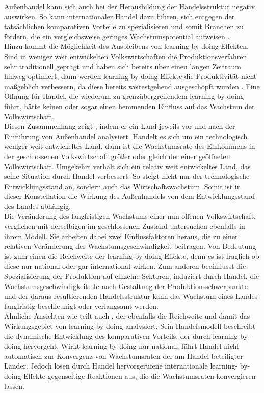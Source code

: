%
 Außenhandel kann sich auch bei der Herausbildung der Handelsstruktur negativ auswirken. So kann internationaler Handel dazu führen, sich entgegen der tatsächlichen komparativen Vorteile zu spezialisieren und somit Branchen zu fördern, die ein vergleichsweise geringes Wachstumspotential aufweisen \cite[Kapitel 5, S.277-278]{Acemoglu.2009}.\\
%
Hinzu kommt die Möglichkeit des Ausbleibens von learning-by-doing-Effekten. Sind in weniger weit entwickelten Volkswirtschaften die Produktionsverfahren sehr traditionell geprägt und haben sich bereits über einen langen Zeitraum hinweg optimiert, dann werden learning-by-doing-Effekte die Produktivität nicht maßgeblich verbessern, da diese bereits weitestgehend ausgeschöpft wurden \cite[S.403]{Young.1991}. Eine Öffnung für Handel, die wiederum zu grenzübergreifendem learning-by-doing führt, hätte keinen oder sogar einen hemmenden Einfluss auf das Wachstum der Volkswirtschaft. \\
%
 Diesen Zusammenhang zeigt \cite{Young.1991}, indem er ein Land jeweils vor und nach der Einführung von Außenhandel analysiert. Handelt es sich um ein technologisch weniger weit entwickeltes Land, dann ist die Wachstumsrate des Einkommens in der geschlossenen Volkswirtschaft größer oder gleich der einer geöffneten Volkswirtschaft. Umgekehrt verhält sich ein relativ weit entwickeltes Land, das seine Situation durch Handel verbessert. So steigt nicht nur der technologische Entwicklungsstand an, sondern auch das Wirtschaftswachstum. Somit ist in dieser Konstellation die Wirkung des Außenhandels von dem Entwicklungsstand des Landes abhängig.\\
%
Die Veränderung des langfristigen Wachstums einer nun offenen Volkswirtschaft, verglichen mit derselbigen im geschlossenen Zustand untersuchen ebenfalls \cite{Grossman.1995} in ihrem Modell. Sie arbeiten dabei zwei Einflussfaktoren heraus, die zu einer relativen Veränderung der Wachstumsgeschwindigkeit beitragen. Von Bedeutung ist zum einen die Reichweite der learning-by-doing-Effekte, denn es ist fraglich ob diese nur national oder gar international wirken. Zum anderen beeinflusst die Spezialisierung der Produktion auf einzelne Sektoren, induziert durch Handel, die Wachstumsgeschwindigkeit. Je nach Gestaltung der Produktionsschwerpunkte und der daraus resultierenden Handelsstruktur kann das Wachstum eines Landes langfristig beschleunigt oder verlangsamt werden.\\
%
Ähnliche Ansichten wie \cite{Grossman.1995} teilt auch \cite{Krugman.1987}, der ebenfalls die Reichweite und damit das Wirkungsgebiet von learning-by-doing analysiert. Sein Handelsmodell beschreibt die dynamische Entwicklung des komparativen Vorteils, der durch learning-by-doing hervorgeht.  Wirkt learning-by-doing nur national, führt Handel nicht automatisch zur Konvergenz von Wachstumsraten der am Handel beteiligter Länder. Jedoch lösen durch Handel hervorgerufene internationale learning- by-doing-Effekte gegenseitige Reaktionen aus, die die Wachstumsraten konvergieren lassen. \\
